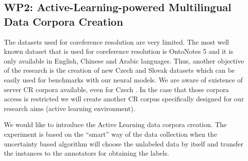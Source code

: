 \subsection*{WP2: Active-Learning-powered Multilingual Data Corpora Creation}

 The datasets used for coreference resolution are very limited. The most well known dataset that is used for coreference resolution is OntoNotes 5 \cite{ontonotes5-Weischedel2013} and it is only available in English, Chinese and Arabic languages. 
 {\color{red}
 Thus, another objective of the research is the creation of new Czech and Slovak datasets which can be easily used for benchmarks with our neural models.
 We are aware of existence of server CR corpora available, even for Czech \cite{cr-mult-Nedoluzhko2021}. 
 In the case that those corpora access is restricted we will create another CR corpus specifically designed for our research aims (active learning environment).  
 }

We would like to introduce the Active Learning data corpora creation. The experiment is based on the “smart” way of the data collection when the uncertainty based algorithm will choose the unlabeled data by itself and transfer the instances to the annotators for obtaining the labels. 

